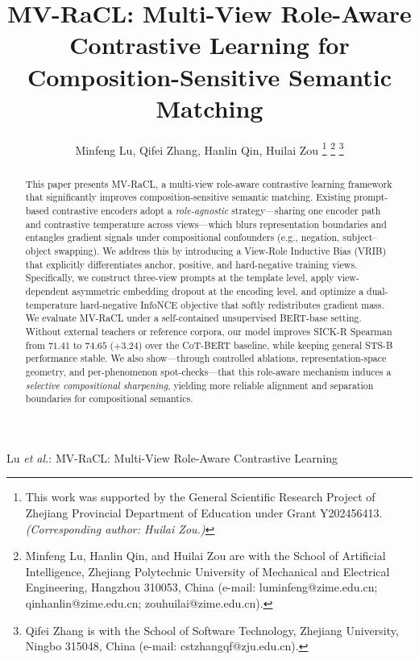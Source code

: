 \documentclass[lettersize,journal]{IEEEtran}
\begin{document}
\title{MV-RaCL: Multi-View Role-Aware Contrastive Learning for Composition-Sensitive Semantic Matching}

\author{Minfeng Lu, Qifei Zhang, Hanlin Qin, Huilai Zou
\thanks{This work was supported by the General Scientific Research Project of Zhejiang Provincial Department of Education under Grant Y202456413. \textit{(Corresponding author: Huilai Zou.)}}
\thanks{Minfeng Lu, Hanlin Qin, and Huilai Zou are with the School of Artificial Intelligence, Zhejiang Polytechnic University of Mechanical and Electrical Engineering, Hangzhou 310053, China (e-mail: luminfeng@zime.edu.cn; qinhanlin@zime.edu.cn; zouhuilai@zime.edu.cn).}
\thanks{Qifei Zhang is with the School of Software Technology, Zhejiang University, Ningbo 315048, China (e-mail: cstzhangqf@zju.edu.cn).}}

%
{Lu \MakeLowercase{\textit{et al.}}: MV-RaCL: Multi-View Role-Aware Contrastive Learning}


\maketitle

\begin{abstract}
This paper presents MV-RaCL, a multi-view role-aware contrastive learning framework that significantly improves composition-sensitive semantic matching. Existing prompt-based contrastive encoders adopt a \emph{role-agnostic} strategy---sharing one encoder path and contrastive temperature across views---which blurs representation boundaries and entangles gradient signals under compositional confounders (e.g., negation, subject--object swapping). We address this by introducing a View-Role Inductive Bias (VRIB) that explicitly differentiates anchor, positive, and hard-negative training views. Specifically, we construct three-view prompts at the template level, apply view-dependent asymmetric embedding dropout at the encoding level, and optimize a dual-temperature hard-negative InfoNCE objective that softly redistributes gradient mass. We evaluate MV-RaCL under a self-contained unsupervised BERT-base setting. Without external teachers or reference corpora, our model improves SICK-R Spearman from $71.41$ to $74.65$ ($+3.24$) over the CoT-BERT baseline, while keeping general STS-B performance stable. We also show---through controlled ablations, representation-space geometry, and per-phenomenon spot-checks---that this role-aware mechanism induces a \emph{selective compositional sharpening}, yielding more reliable alignment and separation boundaries for compositional semantics.
\end{abstract}
\end{document}
